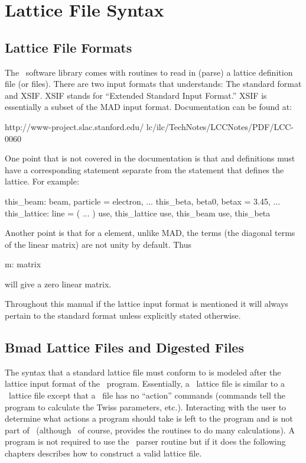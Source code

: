 \chapter{Lattice File Syntax}

\section{Lattice File Formats}
\label{s:lattice_file_formats}

The \bmad\ software library comes with routines to read in (parse) a
lattice definition file (or files). There are two input formats that
\bmad understands: The \bmad standard format and XSIF. XSIF stands for
``Extended Standard Input Format.''  XSIF is essentially a subset of
the MAD input format. Documentation can be found at:
\begin{example}
  http://www-project.slac.stanford.edu/
              lc/ilc/TechNotes/LCCNotes/PDF/LCC-0060%
\end{example}
One point that is not covered in the documentation is that  and 
 definitions must have a corresponding  statement separate 
from the  statement that defines the lattice. For
example:
\begin{example}
  this_beam: beam, particle = electron, ...
  this_beta, beta0, betax = 3.45, ...
  this_lattice: line = ( ... )
  use, this_lattice
  use, this_beam
  use, this_beta
\end{example}
Another point is that for a  element, unlike MAD, the
 terms (the diagonal terms of the linear matrix) are not
unity by default. Thus
\begin{example}
  m: matrix
\end{example}
will give a zero linear matrix.

Throughout this manual if the lattice input format is mentioned it
will always pertain to the \bmad standard format unless explicitly
stated otherwise.

\section{Bmad Lattice Files and Digested Files}
\label{s:lattice_files}

The syntax that a \bmad standard lattice file
must conform to is modeled after the lattice input format of the \mad\
program.  Essentially, a \bmad\ lattice file is similar to a \mad\
lattice file except that a \bmad\ file has no ``action'' commands
(commands tell the program to calculate the Twiss parameters,
etc.). Interacting with the user to determine what actions a program
should take is left to the program and is not part of \bmad\ (although
\bmad\, of course, provides the routines to do many calculations). A
program is not required to use the \bmad\ parser routine but if it
does the following chapters describes how to construct a valid lattice
file.

